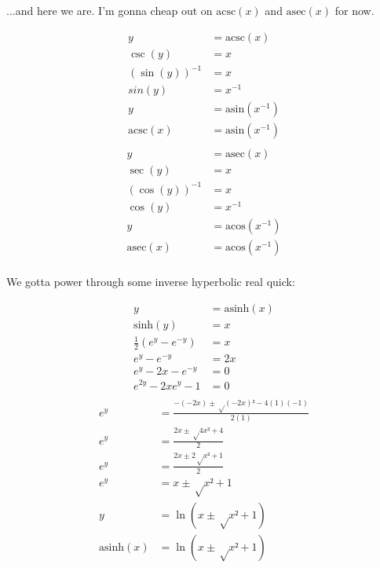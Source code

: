 \documentclass[10pt]{article}
\begin{document}
\begin{multicols}{2}
...and here we are. I'm gonna cheap out on $\mathrm{acsc}(x)$ and $\mathrm{asec}(x)$ for now.

\begin{align*}
   y &=  \mathrm{acsc}(x) \\
   \csc(y) &= x \\
   (\sin(y))^{-1} &= x \\
   sin(y) &= x^{-1} \\
   y &= \mathrm{asin}(x^{-1}) \\
   \mathrm{acsc}(x) &= \mathrm{asin}(x^{-1}) \\
\end{align*}
\begin{align*}
    y &= \mathrm{asec}(x) \\
    \sec(y) &= x \\
    (\cos(y))^{-1} &= x \\
    \cos(y) &= x^{-1} \\
    y &= \mathrm{acos}(x^{-1}) \\
    \mathrm{asec}(x) &= \mathrm{acos}(x^{-1}) \\
\end{align*}

We gotta power through some inverse hyperbolic real quick:

\begin{align*}
    y &= \mathrm{asinh}(x) \\
    \mathrm{sinh}(y) &= x \\
    \frac{1}{2} (e^y - e^{-y}) &= x \\
    e^y - e^{-y} &= 2x \\
    e^y - 2x - e^{-y} &= 0 \\
    e^{2y} - 2x e^y - 1 &= 0 \\
\end{align*}
\begin{align*}
    e^y &= \frac{ -(-2x) ± √{(-2x)² - 4(1)(-1)} }{2(1)} \\
    e^y &= \frac{ 2x ± √{4x² + 4} }{2} \\
    e^y &= \frac{ 2x ± 2 √{x² + 1} }{2} \\
    e^y &= x ± √{x² + 1} \\
    y &= \ln(x ± √{x² + 1}) \\
    \mathrm{asinh}(x) &= \ln(x ± √{x² + 1})
\end{align*}


\end{multicols}
\end{document}
